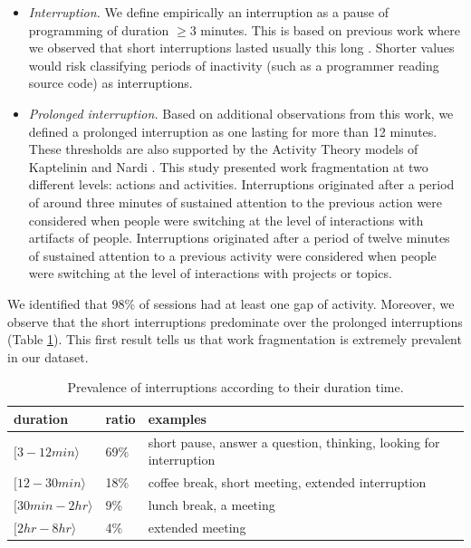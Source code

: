 \documentclass[times]{smrauth}
\newcommand\RR[1]{\textbf{Romain #1}}
\begin{document}
\begin{itemize}
	\item \textit{Interruption.} We define empirically an interruption as a pause of programming of duration $\geq 3$ minutes. This is based on previous work where we observed that short interruptions lasted usually this long \cite{GM04}. Shorter values would risk classifying periods of inactivity (such as a programmer reading source code) as interruptions.
	
	\item \textit{Prolonged interruption.} Based on additional observations from this work, we defined a prolonged interruption as one lasting for more than 12 minutes. These thresholds are also supported by the Activity Theory models of Kaptelinin and Nardi \cite{KaptelininN07}. This study presented work fragmentation at two different levels: actions and activities. Interruptions originated after a period of around three minutes of sustained attention to the previous action were considered when people were switching at the level of interactions with artifacts of people. Interruptions originated after a period of twelve minutes of sustained attention to a previous activity were considered when people were switching at the level of interactions with projects or topics.  
\end{itemize}



We identified that 98\% of sessions had at least one gap of activity. Moreover, we observe that the short interruptions predominate over the prolonged interruptions (Table \ref{tbl:by_duration}). This first result tells us that work fragmentation is extremely prevalent in our dataset.

\begin{table}[ht!]
	\small
	\renewcommand{\arraystretch}{1.3}
	\caption{Prevalence of interruptions according to their duration time. }
	\label{tbl:by_duration}
	\centering
	\begin{tabular}{p{3cm}|p{0.8cm}|p{6cm}} 
		duration & ratio & examples  \\
		\hline   
		$[3  - 12 min \rangle$ & 69\% & short pause, answer a question, thinking, looking for interruption  \\ 
		\hline 
		$[12  - 30 min \rangle$ & 18\% & coffee break, short meeting, extended interruption  \\
		$[30 min - 2 hr \rangle$  & 9\% & lunch break, a meeting  \\
		$[2 hr - 8 hr \rangle$ & 4\% & extended meeting \\
	\end{tabular}
\end{table}
\end{document}
